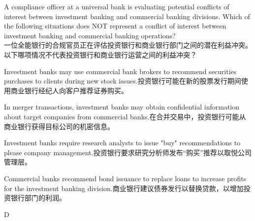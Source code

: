 \documentclass{article}
\newcounter{question} %
\begin{document}
\begin{question}
    A compliance officer at a universal bank is evaluating potential conflicts of interest between investment banking and commercial banking divisions. Which of the following situations does NOT represent a conflict of interest between investment banking and commercial banking operations?\\
    一位全能银行的合规官员正在评估投资银行和商业银行部门之间的潜在利益冲突。以下哪项情况不代表投资银行和商业银行运营之间的利益冲突？
\end{question}
\begin{choices}
    \item Investment banks may use commercial bank brokers to recommend securities purchases to clients during new stock issues.投资银行可能在新的股票发行期间使用商业银行经纪人向客户推荐证券购买。
    \item In merger transactions, investment banks may obtain confidential information about target companies from commercial banks.在合并交易中，投资银行可能从商业银行获得目标公司的机密信息。
    \item Investment banks require research analysts to issue "buy" recommendations to please company management.投资银行要求研究分析师发布“购买”推荐以取悦公司管理层。
    \item Commercial banks recommend bond issuance to replace loans to increase profits for the investment banking division.商业银行建议债券发行以替换贷款，以增加投资银行部门的利润。
\end{choices}

\begin{correctanswer}
    D
\end{correctanswer}
\end{document}
